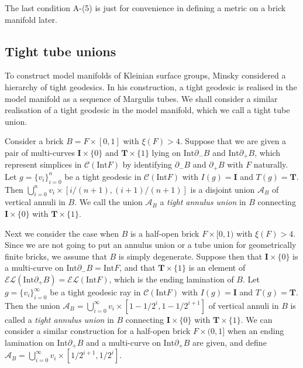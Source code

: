 \documentclass{amsart}
\theoremstyle{definition}
\numberwithin{figure}{section}
\numberwithin{equation}{section}
\newcommand{\blackboard}[1]{\ensuremath{\mathbb{#1}}}
\newcommand{\complexes}{\blackboard{C}}
\def\cc{\complexes}
\def\ca{\mathcal{A}}
\def\cc{\mathcal{C}}
\def\part{\partial}
\def\Int{\mathrm{Int}}
\begin{document}

The last condition A-(5) is just for convenience in defining a metric on a brick manifold later.
\subsection{Tight tube unions}\label{B_d}
To construct model manifolds of Kleinian surface groups, Minsky considered a hierarchy of tight geodesics.
In his construction, a tight geodesic is realised in the model manifold as a sequence of Margulis tubes.
We shall consider a similar realisation of a tight geodesic in the model manifold, which we call a tight tube union.


Consider a brick $B=F\times [0,1]$ with $\xi(F)>4$.
Suppose that we are given a pair of multi-curves  $\boldsymbol{I}\times \{0\}$ and $\boldsymbol{T}\times \{1\}$ lying on  $\Int \part_- B$ and $\Int \part_+ B$, which 
represent simplices in  $\cc(\Int F)$ by identifying $\partial_-B$ and $\partial_+B$ with $F$ naturally.
Let $g=\{v_i\}_{i=0}^n$ be a tight geodesic in $\cc(\Int F)$ with $I(g)=\boldsymbol{I}$ and 
$T(g)=\boldsymbol{T}$. 
Then $\bigcup_{i=0}^n v_i\times [i/(n+1),(i+1)/(n+1)]$ is a disjoint union $\ca_B$ of vertical annuli in $B$.
We call the union $\ca_B$ a \emph{tight annulus union} in $B$ connecting $\boldsymbol{I}\times \{0\}$ with 
$\boldsymbol{T}\times \{1\}$.

Next we consider the case when $B$ is a half-open brick $F\times [0,1)$ with $\xi(F)>4$.
Since we are not going to put an annulus union or a tube union for geometrically finite bricks, we assume that $B$ is simply degenerate.
Suppose then that $\boldsymbol{I}\times \{0\}$ is a multi-curve on $\Int \partial_-B=\Int F$, and that
$\boldsymbol{T}\times \{1\}$ is an element of $\mathcal{EL}(\Int \part_+ B)=\mathcal{EL}(\Int F)$, which is the ending lamination of $B$.
Let $g=\{v_i\}_{i=0}^\infty$ be a tight geodesic ray in $\cc(\Int F)$ with $I(g)=\boldsymbol{I}$ and 
$T(g)=\boldsymbol{T}$.
Then the union $\ca_B=\bigcup_{i=0}^\infty v_i\times [1-1/2^i,1-1/2^{i+1}]$ of vertical annuli in $B$ is called 
a \emph{tight annulus union} in $B$ connecting $\boldsymbol{I}\times \{0\}$ with $\boldsymbol{T}\times \{1\}$.
We can consider a similar construction for a half-open brick $F \times (0,1]$ when an ending lamination on $\Int \partial_+B$ and a multi-curve on $\Int \partial_+B$ are given, and define $\ca_B=\bigcup_{i=0}^\infty v_i\times [1/2^{i+1},1/2^i]$.
\end{document}
